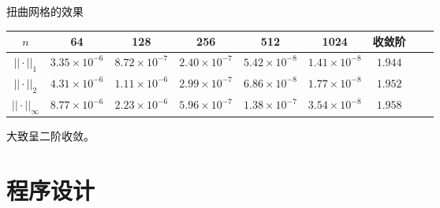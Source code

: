 \documentclass[9pt]{beamer}
\begin{document}
\begin{frame}{扭曲网格的效果}
\begin{table}
  \centering
  \tiny
  \begin{tabular}{c|ccccccc|c}
  \textbf{$n$}       & 64                   & 128                  & 256                  & 512                  & 1024                  & 收敛阶 \\ \hline
  $||\cdot||_1$      & $3.35\times 10^{-6}$ & $8.72\times 10^{-7}$ & $2.40\times 10^{-7}$ & $5.42\times 10^{-8}$ & $1.41\times 10^{-8}$ & $1.944$\\
  $||\cdot||_2$      & $4.31\times 10^{-6}$ & $1.11\times 10^{-6}$ & $2.99\times 10^{-7}$ & $6.86\times 10^{-8}$ & $1.77\times 10^{-8}$ & $1.952$\\
  $||\cdot||_\infty$ & $8.77\times 10^{-6}$ & $2.23\times 10^{-6}$ & $5.96\times 10^{-7}$ & $1.38\times 10^{-7}$ & $3.54\times 10^{-8}$ & $1.958$
  \end{tabular}
\end{table}

大致呈二阶收敛。
\end{frame}

\section{程序设计}
\end{document}
